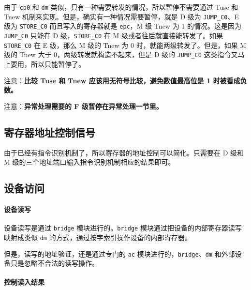 \documentclass[12pt,AutoFakeBold,AutoFakeSlant]{article}
\begin{document}
由于 \texttt{cp0} 和 \texttt{dm}
类似，只有一种需要转发的情况，所以暂停不需要通过 Tuse 和 Tnew
机制来实现。但是，确实有一种情况需要暂停，就是 D 级为
\texttt{JUMP\_C0}、E 级为 \texttt{STORE\_C0} 而且写入的寄存器就是
\texttt{epc}，M 级 Tnew 为 1 的情况。这是因为 \texttt{JUMP\_C0} 只能在 D
级，\texttt{STORE\_C0} 在 M 级或者往后就直接能转发了。如果
\texttt{STORE\_C0} 在 E 级，那么 M 级的 Tnew 为 0
时，就能两级转发了。但是，如果 M 级的 Tnew 大于
0，两级转发就构造不起来，但是 D 级的 \texttt{JUMP\_C0}
这类指令又马上要用，所以只能暂停了。

注意：\textbf{比较 Tuse 和 Tnew 应该用无符号比较，避免数值最高位是 1
时被看成负数。}

注意：\textbf{异常处理需要的 F 级暂停在异常处理一节里。}

\hypertarget{ux5bc4ux5b58ux5668ux5730ux5740ux63a7ux5236ux4fe1ux53f7}{%
\subsection{寄存器地址控制信号}\label{ux5bc4ux5b58ux5668ux5730ux5740ux63a7ux5236ux4fe1ux53f7}}

由于已经有指令识别机制了，所以寄存器的地址控制可以简化。只需要在 D 级和
M 级的三个地址端口输入指令识别机制相应的结果即可。

\hypertarget{ux8bbeux5907ux8bbfux95ee}{%
\subsection{设备访问}\label{ux8bbeux5907ux8bbfux95ee}}

\hypertarget{ux8bbeux5907ux8bfbux5199}{%
\paragraph{设备读写}\label{ux8bbeux5907ux8bfbux5199}}

设备读写是通过 \texttt{bridge} 模块进行的。\texttt{bridge}
模块通过把设备的内部寄存器读写映射成类似 \texttt{dm}
的方式，通过按字索引操作设备的内部寄存器。

但是，读写的地址验证，还是通过专门的 \texttt{ac}
模块进行的，\texttt{bridge}、\texttt{dm}
和外部设备只是忽略不合法的读写操作。

\hypertarget{ux63a7ux5236ux8bfbux5165ux7ed3ux679c}{%
\paragraph{控制读入结果}\label{ux63a7ux5236ux8bfbux5165ux7ed3ux679c}}
\end{document}
